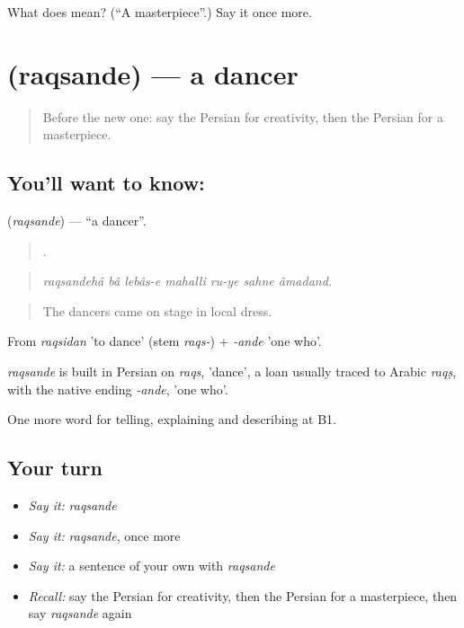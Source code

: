 \begin{tcolorbox}[breakable,colback=teal!4,colframe=teal!35!black,title={Before you move on}]
What does  mean? (\textquotedblleft{}A masterpiece\textquotedblright{}.) Say it once more.
\end{tcolorbox}
\section[\texorpdfstring{\fa{رقصنده} (raqsande)}{رقصنده (raqsande)}]{ (raqsande) — a dancer}

\label{lesson:FA-C527-raqsande}



\begin{quote}
Before the new one: say the Persian for creativity, then the Persian for a masterpiece.
\end{quote}

\subsection*{You'll want to know: }
\textbf{} (\emph{raqsande}) — \textquotedblleft{}a dancer\textquotedblright{}.

\begin{quote}
       .
\end{quote}

\begin{quote}
\emph{raqsandehâ bâ lebâs-e mahalli ru-ye sahne âmadand.}
\end{quote}

\begin{quote}
The dancers came on stage in local dress.
\end{quote}

From \emph{raqsidan} 'to dance' (stem \emph{raqs-}) + \emph{-ande} 'one who'.

\begin{cousinweb}
\emph{raqsande} is built in Persian on \emph{raqs}, 'dance', a loan usually traced to Arabic \emph{raqṣ}, with the native ending \emph{-ande}, 'one who'.
\end{cousinweb}

\begin{grammarlens}[title={What you've built}]
One more word for telling, explaining and describing at B1.
\end{grammarlens}

\subsection*{Your turn}
\begin{itemize}
\raggedright
  \item \emph{Say it:} \emph{raqsande}
  \item \emph{Say it:} \emph{raqsande}, once more
  \item \emph{Say it:} a sentence of your own with \emph{raqsande}
  \item \emph{Recall:} say the Persian for creativity, then the Persian for a masterpiece, then say \emph{raqsande} again
\end{itemize}

